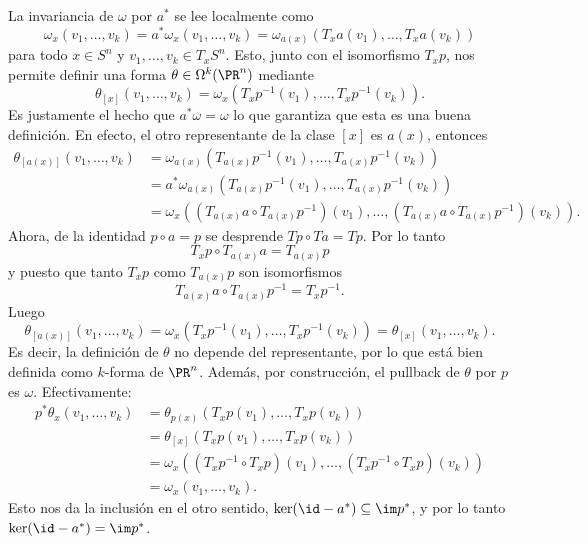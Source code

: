 \documentclass[12pt]{article}
\begin{document}
La invariancia de \( \omega \) por \( a^\ast \) se lee localmente como
\begin{equation*}
	\omega_x(v_1, \dots, v_k) = a^\ast\omega_{x}(v_1, \dots, v_k) = \omega_{a(x)}(T_xa(v_1),
	\dots, T_xa(v_k))
\end{equation*}
para todo \( x \in S^n \) y \( v_1, \dots, v_k \in T_xS^n \). Esto, junto con el
isomorfismo \( T_xp \), nos permite definir una forma \( \theta \in \Omega^k(\PR^n) \)
mediante
\begin{equation*}
	\theta_{[x]} (v_1, \dots, v_k) = \omega_x(T_xp^{-1}(v_1), \dots, T_xp^{-1}(v_k)).
\end{equation*}
Es justamente el hecho que \( a^\ast \omega = \omega \) lo que garantiza que esta es una
buena definición. En efecto, el otro representante de la clase \( [x] \) es \( a(x)
\), entonces
\begin{align*}
	\theta_{[a(x)]}(v_1, \dots, v_k) & = \omega_{a(x)}(T_{a(x)}p^{-1}(v_1), \dots,
	T_{a(x)}p^{-1}(v_k)) \\
																	 & = a^\ast\omega_{a(x)}(T_{a(x)}p^{-1}(v_1), \dots,
																	 T_{a(x)}p^{-1}(v_k)) \\
																	 & = \omega_x\left( (T_{a(x)}a \circ T_{a(x)}p^{-1})(v_1),
																	 \dots, (T_{a(x)}a \circ T_{a(x)}p^{-1})(v_k) \right).
\end{align*}
Ahora, de la identidad \( p \circ a = p \) se desprende \( Tp \circ Ta = Tp \). Por lo
tanto
\begin{equation*}
	T_{x} p \circ T_{a(x)} a = T_{a(x)} p
\end{equation*}
y puesto que tanto \( T_xp \) como \( T_{a(x)}p \) son isomorfismos
\begin{equation*}
	T_{a(x)}a \circ T_{a(x)}p^{-1} = T_xp^{-1}.
\end{equation*}
Luego
\begin{equation*}
	\theta_{[a(x)]}(v_1, \dots, v_k) = \omega_x(T_xp^{-1}(v_1), \dots, T_xp^{-1}(v_k)) =
	\theta_{[x]}(v_1, \dots, v_k).
\end{equation*}
Es decir, la definición de \( \theta \) no depende del representante, por lo que está bien
definida como \( k \)-forma de \( \PR^n \). Además, por construcción, el pullback de \(
\theta \) por \( p \) es \( \omega \). Efectivamente:
\begin{align*}
	p^\ast \theta_x(v_1, \dots, v_k) & = \theta_{p(x)}(T_xp(v_1), \dots, T_xp(v_k)) \\
																	 & = \theta_{[x]}(T_xp(v_1), \dots, T_xp(v_k)) \\
																	 & = \omega_x\left((T_xp^{-1}\circ T_xp)(v_1), \dots,
																	 (T_xp^{-1}\circ T_xp)(v_k)\right) \\
																	 & = \omega_x(v_1, \dots, v_k).
\end{align*}
Esto nos da la inclusión en el otro sentido, \( \ker(\id - a^\ast) \subseteq \im p^\ast
\), y por lo tanto \( \ker(\id - a^\ast) = \im p^\ast \).
\end{document}
